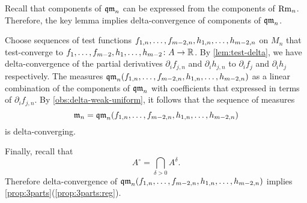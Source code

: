 Recall that components of $\operatorname{\mathfrak{qm}}_n$ can be expressed from the components of $\operatorname{\rm Rm}_n$.
Therefore, the key lemma implies delta-convergence of components of $\operatorname{\mathfrak{qm}}_n$.

Choose sequences of test functions $f_{1,n},\dots,f_{m-2,n},h_{1,n},\zz\dots,h_{m-2,n}$ on $M_n$ that test-converge to $f_{1},\dots,f_{m-2},h_{1},\dots,h_{m-2}\colon A\to \mathbb{R}$.
By \ref{lem:test-delta}, we have delta-convergence of the partial derivatives $\partial_if_{j,n}$ and 
$\partial_ih_{j,n}$ to $\partial_if_{j}$ and 
$\partial_ih_{j}$ respectively.
The measures $\qm_n(f_{1,n},\dots,f_{m-2,n},h_{1,n},\zz\dots,h_{m-2,n})$ 
as a linear combination of the components of $\operatorname{\mathfrak{qm}}_n$ with coefficients that expressed in terms of $\partial_if_{j,n}$.
By \ref{obs:delta-weak-uniform}, it follows that the sequence of measures 
\[\mathfrak m_n=\qm_n(f_{1,n},\dots,f_{m-2,n},h_{1,n},\zz\dots,h_{m-2,n})\]
is delta-converging.

Finally, recall that 
\[A^\circ=\bigcap_{\delta>0}A^\delta.\]
Therefore delta-convergence of $\qm_n(f_{1,n},\dots,f_{m-2,n},h_{1,n},\zz\dots,h_{m-2,n})$ implies \ref{prop:3parts}(\ref{prop:3parts:reg}).
\qeds

